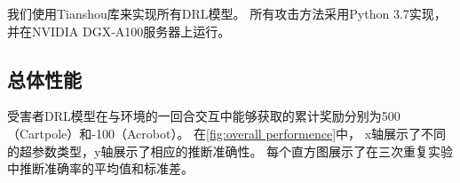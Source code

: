 \begin{table}[!t]
    \caption{攻击模型的网络结构。
    在每个卷积层中，$K_c$（核大小）从7变为3。
    $C_o$是输出通道数，变量\textit{stride}是互相关步长。
    $L_{out}$是AdaptiveAvgPool函数的输出向量长度。
    }
    \label{tab:structure of attack model}
    \centering
\end{table}

我们使用Tianshou库\cite{weng2021tianshou}来实现所有DRL模型。
所有攻击方法采用Python 3.7实现，并在NVIDIA DGX-A100服务器上运行。

\subsection{总体性能}
\label{sec:overall performance}
受害者DRL模型在与环境的一回合交互中能够获取的累计奖励分别为500（Cartpole）和-100（Acrobot）。
在\autoref{fig:overall performence}中，
x轴展示了不同的超参数类型，y轴展示了相应的推断准确性。
每个直方图展示了在三次重复实验中推断准确率的平均值和标准差。


